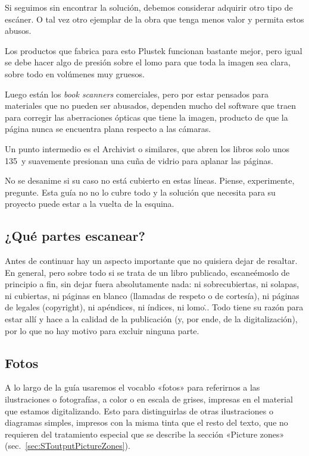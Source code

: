 \documentclass[%
	a5paper,
	10pt,
	twoside,
	openright,
	final,
]{memoir}
\begin{document}
{	Si seguimos sin encontrar la solución, debemos considerar adquirir otro tipo de escáner. O tal vez otro ejemplar de la obra que tenga menos valor y permita estos abusos.

	Los productos que fabrica para esto Plustek funcionan bastante mejor, pero igual se debe hacer algo de presión sobre el lomo para que toda la imagen sea clara, sobre todo en volúmenes muy gruesos.

	Luego están los \emph{book scanners} comerciales, pero por estar pensados para materiales que no pueden ser abusados, dependen mucho del software que traen para corregir las aberraciones ópticas que tiene la imagen, producto de que la página nunca se encuentra plana respecto a las cámaras.

	Un punto intermedio es el Archivist o similares, que abren los libros solo unos 135\textdegree\ y suavemente presionan una cuña de vidrio para aplanar las páginas.

	No se desanime si su caso no está cubierto en estas líneas. Piense, experimente, pregunte. Esta guía no no lo cubre todo y la solución que necesita para su proyecto puede estar a la vuelta de la esquina.

	\subsection{¿Qué partes escanear?\label{sec:scanningWhatToScan}} Antes de continuar hay un aspecto importante que no quisiera dejar de resaltar. En general, pero sobre todo si se trata de un libro publicado, escaneémoslo de principio a fin, sin dejar fuera absolutamente nada: ni sobrecubiertas, ni solapas, ni cubiertas, ni páginas en blanco (llamadas de respeto o de cortesía), ni páginas de legales (copyright), ni apéndices, ni índices, ni lomo\... Todo tiene su razón para estar allí y hace a la calidad de la publicación (y, por ende, de la digitalización), por lo que no hay motivo para excluir ninguna parte.

	\subsection{Fotos\label{sec:scanningPhotos}} A lo largo de la guía usaremos el vocablo «fotos» para referirnos a las ilustraciones o fotografías, a color o en escala de grises, impresas en el material que estamos digitalizando. Esto para distinguirlas de otras ilustraciones o diagramas simples, impresos con la misma tinta que el resto del texto, que no requieren del tratamiento especial que se describe la sección «Picture zones» (sec.~\ref{sec:SToutputPictureZones}).

}
\end{document}
